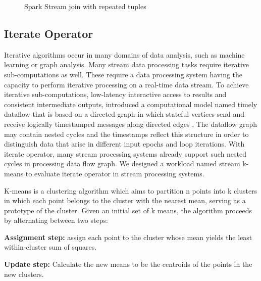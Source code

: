 \begin{figure}
  \begin{center}
   \caption{Spark Stream join with repeated tuples}
   \label{fig:spark_join_repeat}
  \end{center}
\end{figure}

\subsection{Iterate Operator}
\label{sub:iterate_operator}

Iterative algorithms occur in many domains of data analysis, such as machine learning or graph analysis. Many stream data processing tasks require iterative sub-computations as well. These require a data processing system having the capacity to perform iterative processing on a real-time data stream. To achieve iterative sub-computations,  low-latency interactive access to results and consistent intermediate outputs, \citeauthor{murray2013naiad} introduced a computational model named timely dataflow that is based on a directed graph in which stateful vertices send and receive logically timestamped messages along directed edges \cite{murray2013naiad}. The dataflow graph may contain nested cycles and the timestamps reflect this structure in order to distinguish data that arise in different input epochs and loop iterations. With iterate operator, many stream processing systems already support such nested cycles in processing data flow graph. We designed a workload named stream k-means to evaluate iterate operator in stream processing systems.

K-means is a clustering algorithm which aims to partition n points into k clusters in which each point belongs to the cluster with the nearest mean, serving as a prototype of the cluster\cite{kmeans_wiki}. Given an initial set of k means, the algorithm proceeds by alternating between two steps\cite{mackay2003information}:
\begin{description}
\item\textbf{Assignment step:} assign each point to the cluster whose mean yields the least within-cluster sum of squares.
\item \textbf{Update step:} Calculate the new means to be the centroids of the points in the new clusters.
\end{description}


